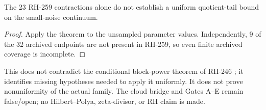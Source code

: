\documentclass[11pt]{article}
\theoremstyle{remark}\newtheorem{remark}[theorem]{Remark}
\begin{document}
\begin{corollary}
The 23 RH-259 contractions alone do not establish a uniform quotient-tail
bound on the small-noise continuum.
\end{corollary}
\begin{proof}
Apply the theorem to the unsampled parameter values.  Independently, 9 of the
32 archived endpoints are not present in RH-259, so even finite archived
coverage is incomplete.
\end{proof}

This does not contradict the conditional block-power theorem of RH-246
\citep{WangRH246}; it identifies missing hypotheses needed to apply it
uniformly.  It does not prove nonuniformity of the actual family.  The cloud
bridge and Gates A--E remain false/open; no Hilbert--Polya, zeta-divisor, or RH
claim is made.


\end{document}
